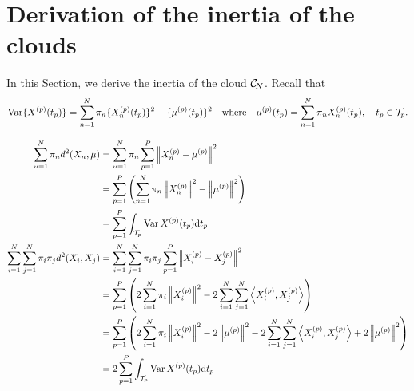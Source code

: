 \section{Derivation of the inertia of the clouds} %
\label{sec:derivation_of_the_inertia_of_the_clouds}

In this Section, we derive the inertia of the cloud $\mathcal{C}_{\!N}$. Recall that 
\begin{equation}\label{eq:var_appendix}
    \operatorname{Var}\{X^{(p)}(t_p)\} = \sum_{n = 1}^N \pi_n \{X_n^{(p)}(t_p)\}^2 - \{\mu^{(p)}(t_p)\}^2 \quad\text{where}\quad \mu^{(p)}(t_p) = \sum_{n = 1}^N \pi_nX_n^{(p)}(t_p), \quad t_p \in \mathcal{T}_{p}.
\end{equation}

\begin{align*}
    \sum_{n = 1}^N \pi_n d^2(X_n, \mu) &= \sum_{n = 1}^N \pi_n \sum_{p = 1}^P\normLp{\Xnp - \mu^{(p)}}^2\\
    &= \sum_{p = 1}^P\left(\sum_{n = 1}^N \pi_n \normLp{\Xnp}^2 - \normLp{\mup{p}}^2\right) \\
    &= \sum_{p = 1}^P \int_{\TT{p}}\Var{\Xp{p}(t_p)} \dd t_p \\
\sum_{i = 1}^N \sum_{j = 1}^N \pi_i \pi_j d^2(X_i, X_j) &= \sum_{i = 1}^N \sum_{j = 1}^N \pi_i \pi_j \sum_{p = 1}^P \normLp{\Xp{p}_i - \Xp{p}_j}^2\\
    &= \sum_{p = 1}^P \left(2\sum_{i = 1}^N \pi_i\normLp{\Xp{p}_i}^2 - 2\sum_{i = 1}^N \sum_{j = 1}^N \inLp{\Xp{p}_i}{\Xp{p}_j}\right) \\
    &= \sum_{p = 1}^P \left(2\sum_{i = 1}^N \pi_i\normLp{\Xp{p}_i}^2 - 2\normLp{\mup{p}}^2 - 2\sum_{i = 1}^N \sum_{j = 1}^N \inLp{\Xp{p}_i}{\Xp{p}_j} + 2\normLp{\mup{p}}^2\right) \\
    &= 2\sum_{p = 1}^P \int_{\TT{p}}\Var{\Xp{p}(t_p)} \dd t_p
\end{align*}



